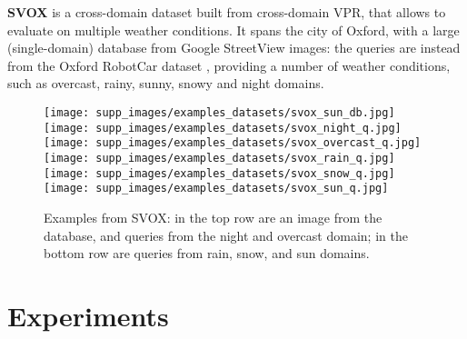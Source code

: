 \documentclass[10pt,twocolumn,letterpaper]{article}
\newcommand{\myparagraph}[1]{\vspace{4pt}\noindent\textbf{#1}}
\begin{document}
\myparagraph{SVOX} \cite{Berton_2021_svox}
is a cross-domain dataset built from cross-domain VPR, that allows to evaluate on multiple weather conditions.
It spans the city of Oxford, with a large (single-domain) database from Google StreetView images: the queries are instead from the Oxford RobotCar dataset \cite{Maddern_2017_robotCar}, providing a number of weather conditions, such as overcast, rainy, sunny, snowy and night domains.
\vspace{-0.3cm}
\begin{figure}[H]
    \begin{center}
    \texttt{[image: supp\_images/examples\_datasets/svox\_sun\_db.jpg]}
    \texttt{[image: supp\_images/examples\_datasets/svox\_night\_q.jpg]}
    \texttt{[image: supp\_images/examples\_datasets/svox\_overcast\_q.jpg]}
    \texttt{[image: supp\_images/examples\_datasets/svox\_rain\_q.jpg]}
    \texttt{[image: supp\_images/examples\_datasets/svox\_snow\_q.jpg]}
    \texttt{[image: supp\_images/examples\_datasets/svox\_sun\_q.jpg]}
    \end{center}
    \vspace{-0.6cm}
    \caption{Examples from SVOX: in the top row are an image from the database, and queries from the night and overcast domain; in the bottom row are queries from rain, snow, and sun domains.}
\end{figure}
\vspace{-0.3cm}




\section{Experiments}
\label{sec:supp_experiments}
\end{document}
